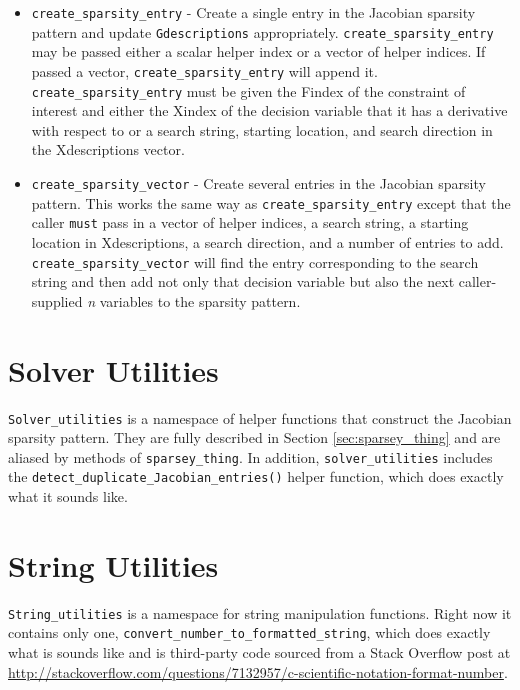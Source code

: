 \begin{itemize}
	\item \texttt{create\_sparsity\_entry} - Create a single entry in the Jacobian sparsity pattern and update \texttt{Gdescriptions} appropriately. \texttt{create\_sparsity\_entry} may be passed either a scalar helper index or a vector of helper indices. If passed a vector, \texttt{create\_sparsity\_entry} will append it. \texttt{create\_sparsity\_entry} must be given the Findex of the constraint of interest and either the Xindex of the decision variable that it has a derivative with respect to or a search string, starting location, and search direction in the Xdescriptions vector.
	\item \texttt{create\_sparsity\_vector} - Create several entries in the Jacobian sparsity pattern. This works the same way as \texttt{create\_sparsity\_entry} except that the caller \texttt{must} pass in a vector of helper indices, a search string, a starting location in Xdescriptions, a search direction, and a number of entries to add. \texttt{create\_sparsity\_vector} will find the entry corresponding to the search string and then add not only that decision variable but also the next caller-supplied \textit{n} variables to the sparsity pattern.
\end{itemize}

\section{Solver Utilities}
\label{sec:solver_utilities}

\texttt{Solver\_utilities} is a namespace of helper functions that construct the Jacobian sparsity pattern. They are fully described in Section \ref{sec:sparsey_thing} and are aliased by methods of \texttt{sparsey\_thing}. In addition, \texttt{solver\_utilities} includes the \texttt{detect\_duplicate\_Jacobian\_entries()} helper function, which does exactly what it sounds like.

\section{String Utilities}
\label{sec:string_utilities}

\texttt{String\_utilities} is a namespace for string manipulation functions. Right now it contains only one, \texttt{convert\_number\_to\_formatted\_string}, which does exactly what is sounds like and is third-party code sourced from a Stack Overflow post at \url{http://stackoverflow.com/questions/7132957/c-scientific-notation-format-number}.

